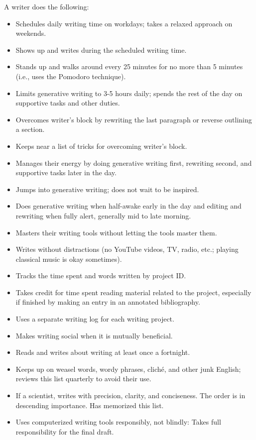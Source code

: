 \documentclass[11pt,letterpaper]{article}
\begin{document}
A writer does the following:


\begin{itemize}
\item Schedules daily writing time on workdays; takes a relaxed approach on weekends.
\item Shows up and writes during the scheduled writing time.
\item Stands up and walks around every 25 minutes for no more than 5 minutes (i.e., uses the Pomodoro technique).
\item Limits generative writing to 3-5 hours daily; spends the rest of the day on supportive tasks and other duties.
\item Overcomes writer's block by rewriting the last paragraph or reverse outlining a section.
\item Keeps near a list of tricks for overcoming writer's block.
\item Manages their energy by doing generative writing first, rewriting second, and supportive tasks later in the day.
\item Jumps into generative writing; does not wait to be inspired.
\item Does generative writing when half-awake early in the day and editing and rewriting when fully alert, generally mid to late morning.
\item Masters their writing tools without letting the tools master them.
\item Writes without distractions (no YouTube videos, TV, radio, etc.; playing classical music is okay sometimes).
\item Tracks the time spent and words written by project ID.
\item Takes credit for time spent reading material related to the project, especially if finished by making an entry in an annotated bibliography.
\item Uses a separate writing log for each writing project.
\item Makes writing social when it is mutually beneficial.
\item Reads and writes about writing at least once a fortnight.
\item Keeps up on weasel words,  wordy phrases, cliché, and other junk English; reviews this list quarterly to avoid their use.
\item If a scientist, writes with precision, clarity, and conciseness. The order is in descending importance. Has memorized this list.
\item Uses computerized writing tools responsibly, not blindly: Takes full responsibility for the final draft.

\end{itemize}
\end{document}
